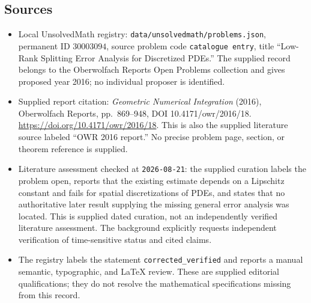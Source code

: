 \documentclass[11pt]{article}
\begin{document}
\subsection{Sources}
\begin{itemize}
\item Local UnsolvedMath registry: \texttt{data/unsolvedmath/problems.json}, permanent ID \(30003094\), source problem code \texttt{catalogue entry}, title ``Low-Rank Splitting Error Analysis for Discretized PDEs.'' The supplied record belongs to the Oberwolfach Reports Open Problems collection and gives proposed year 2016; no individual proposer is identified.
\item Supplied report citation: \emph{Geometric Numerical Integration} (2016), Oberwolfach Reports, pp.\ 869--948, DOI 10.4171/owr/2016/18. \url{https://doi.org/10.4171/owr/2016/18}. This is also the supplied literature source labeled ``OWR 2016 report.'' No precise problem page, section, or theorem reference is supplied.
\item Literature assessment checked at \texttt{2026-08-21}: the supplied curation labels the problem open, reports that the existing estimate depends on a Lipschitz constant and fails for spatial discretizations of PDEs, and states that no authoritative later result supplying the missing general error analysis was located. This is supplied dated curation, not an independently verified literature assessment. The background explicitly requests independent verification of time-sensitive status and cited claims.
\item The registry labels the statement \texttt{corrected\_verified} and reports a manual semantic, typographic, and LaTeX review. These are supplied editorial qualifications; they do not resolve the mathematical specifications missing from this record.
\end{itemize}
\end{document}
